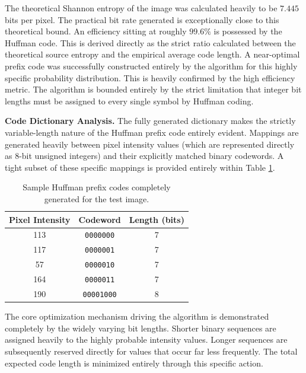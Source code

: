 The theoretical Shannon entropy of the image was calculated heavily to be $7.445$ bits per pixel. The practical bit rate generated is exceptionally close to this theoretical bound. An efficiency sitting at roughly $99.6\%$ is possessed by the Huffman code. This is derived directly as the strict ratio calculated between the theoretical source entropy and the empirical average code length. A near-optimal prefix code was successfully constructed entirely by the algorithm for this highly specific probability distribution. This is heavily confirmed by the high efficiency metric. The algorithm is bounded entirely by the strict limitation that integer bit lengths must be assigned to every single symbol by Huffman coding.

\vspace{1em}
\noindent\textbf{Code Dictionary Analysis.} The fully generated dictionary makes the strictly variable-length nature of the Huffman prefix code entirely evident. Mappings are generated heavily between pixel intensity values (which are represented directly as 8-bit unsigned integers) and their explicitly matched binary codewords. A tight subset of these specific mappings is provided entirely within Table \ref{tab:huffman_samples}.

\begin{table}[h]
    \centering
    \begin{tabular}{ccc}
        \toprule
        \textbf{Pixel Intensity} & \textbf{Codeword} & \textbf{Length (bits)} \\
        \midrule
        113 & \texttt{0000000} & 7 \\
        117 & \texttt{0000001} & 7 \\
        57  & \texttt{0000010} & 7 \\
        164 & \texttt{0000011} & 7 \\
        190 & \texttt{00001000} & 8 \\
        \bottomrule
    \end{tabular}
    \caption{Sample Huffman prefix codes completely generated for the test image.}
    \label{tab:huffman_samples}
\end{table}

The core optimization mechanism driving the algorithm is demonstrated completely by the widely varying bit lengths. Shorter binary sequences are assigned heavily to the highly probable intensity values. Longer sequences are subsequently reserved directly for values that occur far less frequently. The total expected code length is minimized entirely through this specific action.


